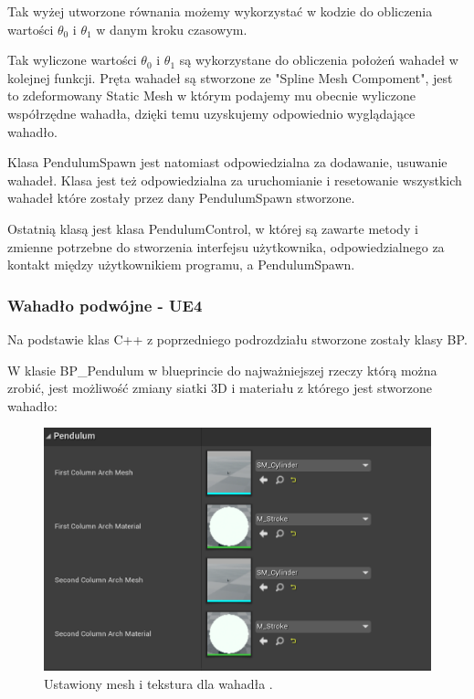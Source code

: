 \documentclass[a4paper,12pt,reqno]{article}
\begin{document}
Tak wyżej utworzone równania możemy wykorzystać w kodzie do obliczenia wartości $\theta_0$ i $\theta_1$ w danym kroku czasowym.


\label{ComputeTheta}


Tak wyliczone wartości $\theta_0$ i $\theta_1$ są wykorzystane do obliczenia położeń wahadeł w kolejnej funkcji. Pręta wahadeł są stworzone ze "Spline Mesh Compoment", jest to zdeformowany Static Mesh w którym podajemy mu obecnie wyliczone współrzędne wahadła, dzięki temu uzyskujemy odpowiednio wyglądające wahadło.




Klasa PendulumSpawn jest natomiast odpowiedzialna za dodawanie, usuwanie wahadeł. Klasa jest też odpowiedzialna za uruchomianie i resetowanie wszystkich wahadeł które zostały przez dany PendulumSpawn stworzone.

Ostatnią klasą jest klasa PendulumControl, w której są zawarte metody i zmienne potrzebne do stworzenia interfejsu użytkownika, odpowiedzialnego za kontakt między użytkownikiem programu, a PendulumSpawn.

\subsubsection{Wahadło podwójne - UE4}

Na podstawie klas C++ z poprzedniego podrozdziału stworzone zostały klasy BP.


W klasie BP\_Pendulum w blueprincie do najważniejszej rzeczy którą można zrobić, jest możliwość zmiany siatki 3D i materiału z którego jest stworzone wahadło:

\begin{figure}[!ht]%
\centering
\includegraphics[width=0.7\columnwidth]{graphics/pendulum/PendulumBP.png}
\caption{Ustawiony mesh i tekstura dla wahadła .
\label{BPExample}}%
%
\qquad
\end{figure}  
\end{document}
